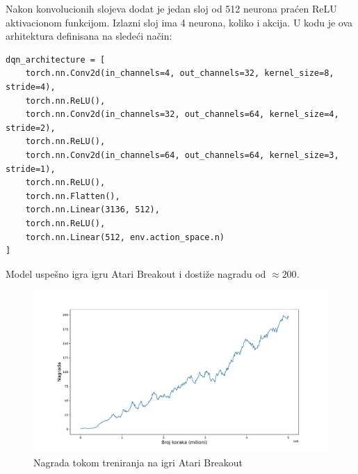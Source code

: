 \documentclass[a4paper,fleqn,12pt]{JMThesis}
\theoremstyle{plain}
\theoremstyle{definition}
\theoremstyle{definition}
\begin{document}
Nakon konvolucionih slojeva dodat je jedan sloj od 512 neurona praćen ReLU aktivacionom funkcijom.
Izlazni sloj ima 4 neurona, koliko i akcija. U kodu je ova arhitektura definisana na sledeći način:
\begin{verbatim}
dqn_architecture = [
    torch.nn.Conv2d(in_channels=4, out_channels=32, kernel_size=8, stride=4),
    torch.nn.ReLU(),
    torch.nn.Conv2d(in_channels=32, out_channels=64, kernel_size=4, stride=2),
    torch.nn.ReLU(),
    torch.nn.Conv2d(in_channels=64, out_channels=64, kernel_size=3, stride=1),
    torch.nn.ReLU(),
    torch.nn.Flatten(),
    torch.nn.Linear(3136, 512),
    torch.nn.ReLU(),
    torch.nn.Linear(512, env.action_space.n)
]
\end{verbatim}
Model uspešno igra igru Atari Breakout i dostiže nagradu od $\approx 200$.
\begin{figure}[!ht]
	\centering
	\includegraphics[scale=0.4]{../graph-visuals/breakout/plot.pdf}
	\caption{Nagrada tokom treniranja na igri Atari Breakout}
\end{figure}
\end{document}
